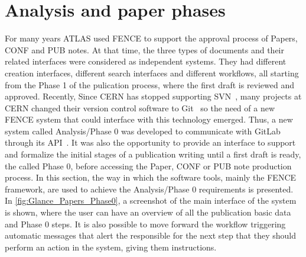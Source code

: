 
\section{Analysis and paper phases}%
\label{sec:Analysis_and_paper_phases}

For many years ATLAS used FENCE to support the approval process of Papers, CONF and PUB notes.
At that time, the three types of documents and their related interfaces were considered as independent systems.
They had different creation interfaces, different search interfaces and different workflows, all starting from the Phase 1 of the pulication process, where the first draft is reviewed and approved.
Recently, Since CERN has stopped supporting SVN~\cite{svn}, many projects at CERN changed their version control software to Git~\cite{git} so the need of a new FENCE system that could interface with this technology emerged.
Thus, a new system called Analysis/Phase 0 was developed to communicate with GitLab~\cite{gitlab} through its API~\cite{rest_api}. It was also the opportunity to provide an interface to support and formalize the initial stages of a publication writing until a first draft is ready, the called Phase 0, before accessing the Paper, CONF or PUB note production process.
In this section, the way in which the software tools, mainly the FENCE framework, are used to achieve the Analysis/Phase 0 requirements is presented.
In \cref{fig:Glance_Papers_Phase0}, a screenshot of the main interface of the system is shown, where the user can have an overview of all the publication basic data and Phase 0 steps.
It is also possible to move forward the workflow triggering automatic messages that alert the responsible for the next step that they should perform an action in the system, giving them instructions.

